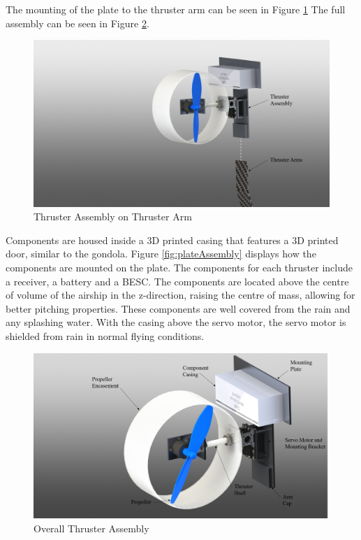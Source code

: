 \documentclass[../main.tex]{subfiles}
\begin{document}
The mounting of the plate to the thruster arm can be seen in Figure \ref{fig:thrusterOnKeel} The full assembly can be seen in Figure \ref{fig:thrusterAssembly}.  

\begin{figure}[H]
	\centering
	\includegraphics[width=.8\linewidth]{img/design/thruster/thrusterOnKeel.png}
	\caption{Thruster Assembly on Thruster Arm}
	\label{fig:thrusterOnKeel}
\end{figure}

Components are housed inside a 3D printed casing that features a 3D printed door, similar to the gondola. Figure \ref{fig:plateAssembly} displays how the components are mounted on the plate. The components for each thruster include a receiver, a battery and a BESC. The components are located above the centre of volume of the airship in the z-direction, raising the centre of mass, allowing for better pitching properties. These components are well covered from the rain and any splashing water. With the casing above the servo motor, the servo motor is shielded from rain in normal flying conditions.

\begin{figure}[H]
	\centering
	\includegraphics[width=.8\linewidth]{img/design/thruster/thrusterAssembly.png}
	\caption{Overall Thruster Assembly}
	\label{fig:thrusterAssembly}
\end{figure}
\end{document}
